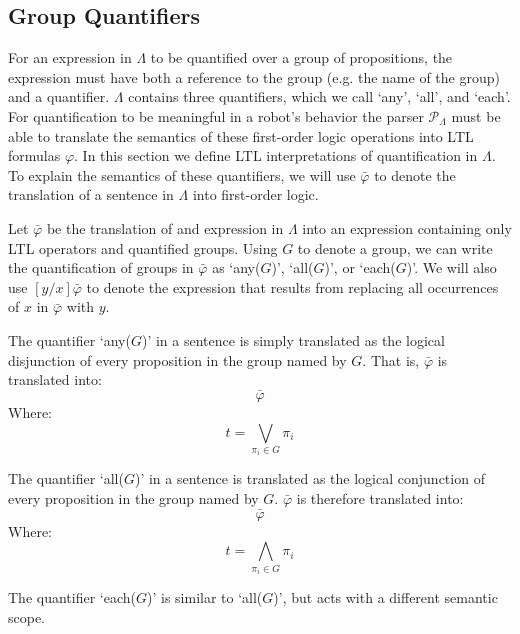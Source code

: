 \subsection{Group Quantifiers}

For an expression in $\Lambda$ to be quantified over a group of propositions, the expression must have both a reference to the group (e.g. the name of the group) and a quantifier. 
$\Lambda$ contains three quantifiers, which we call `any', `all', and `each'. 
For quantification to be meaningful in a robot's behavior the parser $\mathcal{P}_{\Lambda}$ must be able to translate the semantics of these first-order logic operations into LTL formulas $\varphi$.
In this section we define LTL interpretations of quantification in $\Lambda$.  
To explain the semantics of these quantifiers, we will use $\bar{\varphi}$ to denote the translation of a sentence in $\Lambda$ into first-order logic. 
\par Let $\bar{\varphi}$ be the translation of and expression in $\Lambda$ into an expression containing only LTL operators and quantified groups. 
Using $G$ to denote a group, we can write the quantification of groups in $\bar{\varphi}$ as `any($G$)', `all($G$)', or `each($G$)'. 
We will also use $[y/x]\bar{\varphi}$ to denote the expression that results from replacing all occurrences of $x$ in $\bar{\varphi}$ with $y$. 
\par
The quantifier `any($G$)' in a sentence is simply translated as the logical disjunction of every proposition in the group named by $G$. 
That is, $\bar{\varphi}$ is translated into: 
\begin{equation*}
	[ t / \text{any}(G)] \bar{\varphi}
\end{equation*}
Where: 
\begin{equation*}
	t = \bigvee \limits_{\pi_i \in G} \pi_i
\end{equation*}
\par
The quantifier `all($G$)' in a sentence is translated as the logical conjunction of every proposition in the group named by $G$. 
$\bar{\varphi}$ is therefore translated into: 
\begin{equation*}
	[ t / \text{all}(G)] \bar{\varphi}
\end{equation*}
Where:
\begin{equation*}
	t = \bigwedge \limits_{\pi_i \in G} \pi_i
\end{equation*}
\par
The quantifier `each($G$)' is similar to `all($G$)', but acts with a different semantic scope. 
